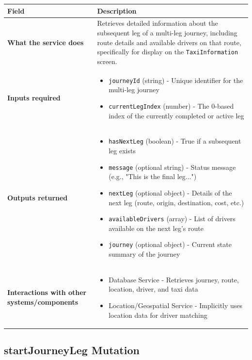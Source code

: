 \documentclass[11pt,a4paper]{article}
\begin{document}
\begin{longtable}{|p{4cm}|p{12cm}|}
\hline
\textbf{Field} & \textbf{Description} \\
\hline
\textbf{What the service does} & 
Retrieves detailed information about the subsequent leg of a multi-leg journey, including route details and available drivers on that route, specifically for display on the \texttt{TaxiInformation} screen. \\
\hline
\textbf{Inputs required} & 
\begin{itemize}[nosep]
\item \texttt{journeyId} (string) - Unique identifier for the multi-leg journey
\item \texttt{currentLegIndex} (number) - The 0-based index of the currently completed or active leg
\end{itemize} \\
\hline
\textbf{Outputs returned} & 
\begin{itemize}[nosep]
\item \texttt{hasNextLeg} (boolean) - True if a subsequent leg exists
\item \texttt{message} (optional string) - Status message (e.g., "This is the final leg...")
\item \texttt{nextLeg} (optional object) - Details of the next leg (route, origin, destination, cost, etc.)
\item \texttt{availableDrivers} (array) - List of drivers available on the next leg's route
\item \texttt{journey} (optional object) - Current state summary of the journey
\end{itemize} \\
\hline
\textbf{Interactions with other systems/components} & 
\begin{itemize}[nosep]
\item Database Service - Retrieves journey, route, location, driver, and taxi data
\item Location/Geospatial Service - Implicitly uses location data for driver matching
\end{itemize} \\
\hline
\end{longtable}

\subsection{startJourneyLeg Mutation}
\end{document}
